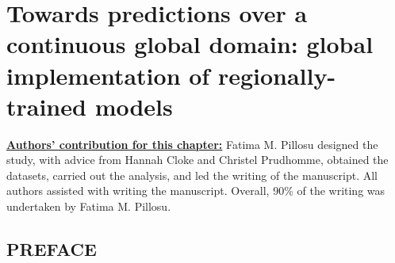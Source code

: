 \ClearShipoutPicture
{}

\chapter{Towards predictions over a continuous global domain: 
global implementation of regionally-trained models}
\label{regional_to_global_training}
\graphicspath{{chapter_07/figures}{chapter_07/tables}}

\underline{\textbf{Authors' contribution for this chapter:}} Fatima M. Pillosu designed the study, with advice from Hannah Cloke and Christel Prudhomme, obtained the datasets, carried out the analysis, and led the writing of the manuscript. All authors assisted with writing the manuscript. Overall, 90\% of the writing was undertaken by Fatima M. Pillosu.

\vspace{\baselineskip}

\section*{PREFACE}

